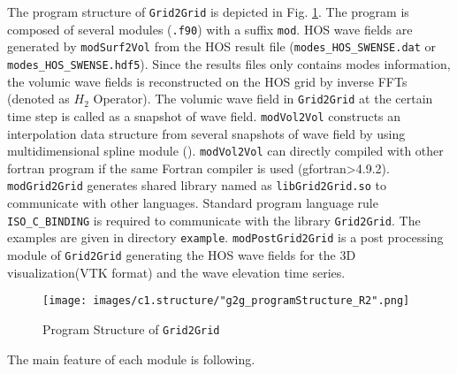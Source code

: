 The program structure of \texttt{Grid2Grid} is depicted in Fig. \ref{fig:grid2GridStructure}. The program is composed of several modules (\texttt{.f90}) with a suffix \texttt{mod}. HOS wave fields are generated by \texttt{modSurf2Vol} from the HOS result file (\texttt{modes\_HOS\_SWENSE.dat} or \texttt{modes\_HOS\_SWENSE.hdf5}). Since the results files only contains modes information, the volumic wave fields is reconstructed on the HOS grid by inverse FFTs (denoted as $H_2$ Operator). The volumic wave field in \texttt{Grid2Grid} at the certain time step is called as a snapshot of wave field. \texttt{modVol2Vol} constructs an interpolation data structure from several snapshots of wave field by using multidimensional spline module (\cite{BsplineWilliams}). \texttt{modVol2Vol} can directly compiled with other fortran program if the same Fortran compiler is used (gfortran>4.9.2). \texttt{modGrid2Grid} generates shared library named as \texttt{libGrid2Grid.so} to communicate with other languages. Standard program language rule \texttt{ISO\_C\_BINDING} is required to communicate with the library \texttt{Grid2Grid}. The examples are given in directory \texttt{example}. \texttt{modPostGrid2Grid} is a post processing module of \texttt{Grid2Grid} generating the HOS wave fields for the 3D visualization(VTK format) and the wave elevation time series.

\vspace{0.5em}
{
    \begin{figure} [H]
    \centering
    \texttt{[image: images/c1.structure/"g2g\_programStructure\_R2".png]}
    \caption{Program Structure of \texttt{Grid2Grid}}
    \label{fig:grid2GridStructure}
    \end{figure}
}

\pagebreak

The main feature of each module is following.
\newline

